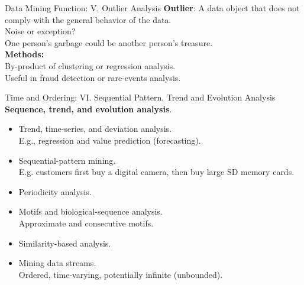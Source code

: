 \begin{frame}{Data Mining Function: V. Outlier Analysis}
	\textbf{Outlier}: A data object that does not comply with the general
	behavior of the data.\\[0.5cm]

	Noise or exception?\\
	One person's garbage could be another person's treasure.\\[0.5cm]

	\textbf{Methods:}\\
	By-product of clustering or regression analysis. \\
	Useful in fraud detection or rare-events analysis.
\end{frame}

\begin{frame}{Time and Ordering: VI. Sequential Pattern, Trend and Evolution
		Analysis}
	\textbf{Sequence, trend, and evolution analysis}.\\
	\begin{itemize}
		\item Trend, time-series, and deviation analysis. \\
		      E.g., regression and value prediction (forecasting).
		\item Sequential-pattern mining.\\
		      E.g. customers first buy a digital camera, then buy large SD memory
		      cards.
		\item Periodicity analysis.
		\item Motifs and biological-sequence analysis.\\
		      Approximate and consecutive motifs.
		\item Similarity-based analysis.\\
		\item Mining data streams.\\
		      Ordered, time-varying, potentially infinite (unbounded).
	\end{itemize}
\end{frame}

